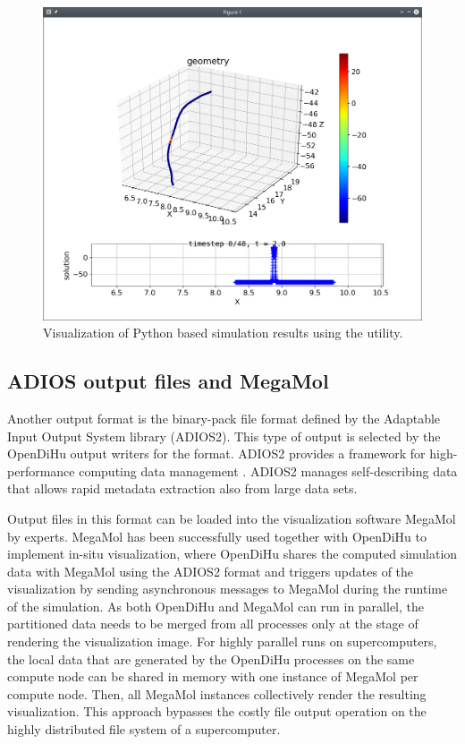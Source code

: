 \begin{figure}%
  \centering%
  \includegraphics[width=\textwidth]{images/implementation/python_output.png}%
  \caption{Visualization of Python based simulation results using the  utility.}%
  \label{fig:python_output}%
\end{figure}%

\subsection{ADIOS output files and MegaMol}
Another output format is the binary-pack file format defined by the Adaptable Input Output System library (ADIOS2). This type of output is selected by the OpenDiHu output writers for the  format. ADIOS2 provides a framework for high-performance computing data management \cite{adios2}. ADIOS2 manages self-describing data that allows rapid metadata extraction also from large data sets.

Output files in this format can be loaded into the visualization software MegaMol by experts. MegaMol has been successfully used together with OpenDiHu to implement in-situ visualization, where OpenDiHu shares the computed simulation data with MegaMol using the ADIOS2 format and triggers updates of the visualization by sending asynchronous messages to MegaMol during the runtime of the simulation. As both OpenDiHu and MegaMol can run in parallel, the partitioned data needs to be merged from all processes only at the stage of rendering the visualization image. For highly parallel runs on supercomputers, the local data that are generated by the OpenDiHu processes on the same compute node can be shared in memory with one instance of MegaMol per compute node. Then, all MegaMol instances collectively render the resulting visualization. This approach bypasses the costly file output operation on the highly distributed file system of a supercomputer.

